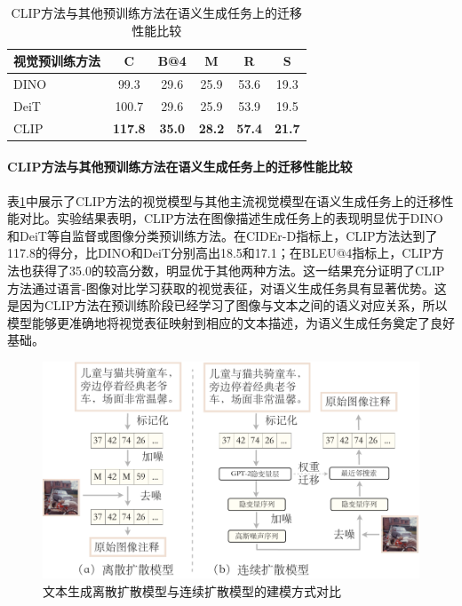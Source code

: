 \begin{table}
  \centering
  \caption{CLIP方法与其他预训练方法在语义生成任务上的迁移性能比较}
  \begin{tabular}{lccccc}
    \toprule
    视觉预训练方法  & C & B@4 & M & R & S\\
    \midrule
    DINO & 99.3  & 29.6 & 25.9 & 53.6 & 19.3 \\
    DeiT & 100.7 & 29.6 & 25.9 & 53.9 & 19.5 \\
    CLIP  & \textbf{117.8} & \textbf{35.0} & \textbf{28.2} & \textbf{57.4} & \textbf{21.7}\\
    \bottomrule
  \end{tabular}
  \label{tab:ddcap-cmp-clip}
\end{table}

\paragraph{CLIP方法与其他预训练方法在语义生成任务上的迁移性能比较}
表\ref{tab:ddcap-cmp-clip}中展示了CLIP方法的视觉模型与其他主流视觉模型在语义生成任务上的迁移性能对比。实验结果表明，CLIP方法在图像描述生成任务上的表现明显优于DINO\cite{dino}和DeiT\cite{deit}等自监督或图像分类预训练方法。在CIDEr-D指标上，CLIP方法达到了117.8的得分，比DINO和DeiT分别高出18.5和17.1；在BLEU@4指标上，CLIP方法也获得了35.0的较高分数，明显优于其他两种方法。这一结果充分证明了CLIP方法通过语言-图像对比学习获取的视觉表征，对语义生成任务具有显著优势。这是因为CLIP方法在预训练阶段已经学习了图像与文本之间的语义对应关系，所以模型能够更准确地将视觉表征映射到相应的文本描述，为语义生成任务奠定了良好基础。

\begin{figure}
  \centering
  \includegraphics[width=0.8\linewidth]{figures/ddcap-cmp-continuous.pdf}
  \caption{文本生成离散扩散模型与连续扩散模型的建模方式对比}
  \label{fig:ddcap-cmp-continuous}
\end{figure}


